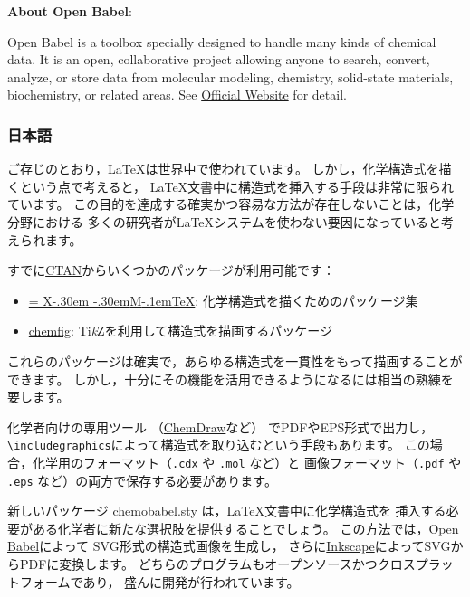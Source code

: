 \documentclass[dvipdfmx,12pt]{jsarticle}
\def\XyM{\ifnum\fam=-1\relax\fam=0\relax\fi\TestCount=\fam%
X\kern-.30em\smash{\raise.50ex\hbox{$\fam\TestCount\Upsilon$}}%
\kern-.30em{M}}
\def\XyMTeX{\XyM\kern-.1em\TeX}
\begin{document}
\noindent \textbf{About Open Babel}:

Open Babel is a toolbox specially designed to handle many kinds of
chemical data. It is an open, collaborative project allowing anyone to search,
convert, analyze, or store data from molecular modeling, chemistry,
solid-state materials, biochemistry, or related areas.
See \href{http://openbabel.org/}{Official Website} for detail.

\clearpage

\subsubsection{日本語}

ご存じのとおり，\LaTeX は世界中で使われています。
しかし，化学構造式を描くという点で考えると，
\LaTeX 文書中に構造式を挿入する手段は非常に限られています。
この目的を達成する確実かつ容易な方法が存在しないことは，化学分野における
多くの研究者が\LaTeX システムを使わない要因になっていると考えられます。

すでに\href{http://www.ctan.org/}{CTAN}からいくつかのパッケージが利用可能です：
\begin{itemize}
  \item \href{http://www.ctan.org/pkg/xymtex}{\XyMTeX}:
    化学構造式を描くためのパッケージ集
  \item \href{http://www.ctan.org/pkg/chemfig}{\textsf{chemfig}}:
    Ti\textit{k}Zを利用して構造式を描画するパッケージ
\end{itemize}
これらのパッケージは確実で，あらゆる構造式を一貫性をもって描画することができます。
しかし，十分にその機能を活用できるようになるには相当の熟練を要します。

化学者向けの専用ツール
（\href{http://www.cambridgesoft.com/Ensemble_for_Chemistry/ChemDraw/}{ChemDraw}など）
でPDFやEPS形式で出力し，\verb|\includegraphics|によって構造式を取り込むという手段もあります。
この場合，化学用のフォーマット（\verb|.cdx| や \verb|.mol| など）と
画像フォーマット（\verb|.pdf| や \verb|.eps| など）の両方で保存する必要があります。

新しいパッケージ \textsf{chemobabel.sty} は，\LaTeX 文書中に化学構造式を
挿入する必要がある化学者に新たな選択肢を提供することでしょう。
この方法では，\href{http://openbabel.org/}{Open Babel}によって
SVG形式の構造式画像を生成し，
さらに\href{https://inkscape.org/ja/}{Inkscape}によってSVGからPDFに変換します。
どちらのプログラムもオープンソースかつクロスプラットフォームであり，
盛んに開発が行われています。 \\
\end{document}
